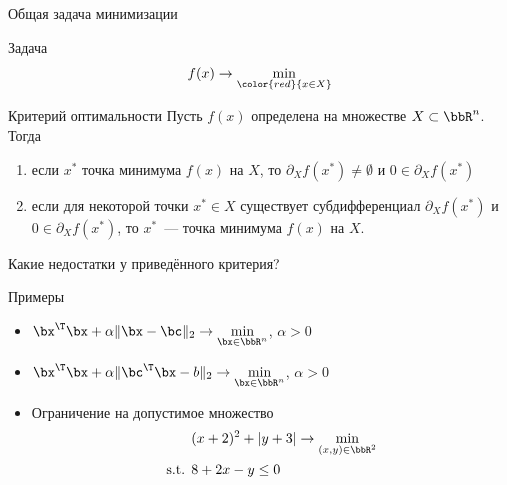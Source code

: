 \documentclass[12pt,russian]{beamer}
\begin{document}
\begin{frame}{Общая задача минимизации}

\begin{block}{Задача}
\[
f(x) \rightarrow \min\limits_{{\color{red}{x \in X}}}
\]
\end{block}

\begin{block}{Критерий оптимальности}
Пусть $f(x)$ определена на множестве $X \subset \bbR^n$.
Тогда 
\begin{enumerate}
\item если $x^*$ точка минимума $f(x)$ на $X$, то $\partial_X f(x^*) \neq \emptyset$ и $0 \in \partial_X f(x^*)$
\item если для некоторой точки $x^* \in X$ существует субдифференциал $\partial_X f(x^*)$ и $0 \in \partial_X f(x^*)$, то $x^*$~--- точка минимума $f(x)$ на $X$.
\end{enumerate}
\end{block}
Какие недостатки у приведённого критерия?

\end{frame}

\begin{frame}{Примеры}
\begin{itemize}
\item $\bx^{\T}\bx + \alpha \| \bx - 
\bc \|_2 \rightarrow \min\limits_{\bx \in \bbR^n}$, $\alpha > 0$
\item $\bx^{\T}\bx + \alpha \| \bc^{\T}\bx - 
b \|_2 \rightarrow \min\limits_{\bx \in \bbR^n}$, $\alpha > 0$
\item Ограничение на допустимое множество
\begin{equation*}
\begin{split}
\vspace{-4mm}
&(x + 2)^2 + |y + 3| \rightarrow \min\limits_{(x, y) \in \bbR^2}\\
\text{s.t. }& 8 + 2x - y \leq 0
\end{split}
\end{equation*}
\end{itemize}
\end{frame}
\end{document}
